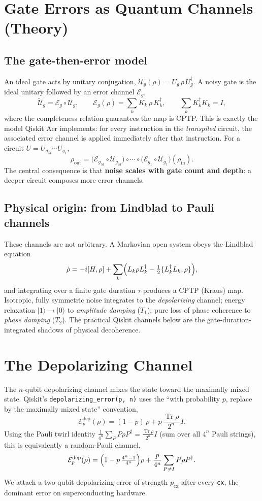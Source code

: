 \documentclass[11pt]{article}
\newcommand{\ket}[1]{|#1\rangle}
\newcommand{\Tr}{\operatorname{Tr}}
\begin{document}
\section{Gate Errors as Quantum Channels (Theory)}

\subsection{The gate-then-error model}

An ideal gate acts by unitary conjugation, $\mathcal{U}_g(\rho)=U_g\,\rho\,U_g^\dagger$. A noisy gate is the ideal unitary followed by an error channel $\mathcal{E}_g$,
\[
  \tilde{\mathcal{U}}_g=\mathcal{E}_g\circ\mathcal{U}_g ,
\qquad
  \mathcal{E}_g(\rho)=\sum_k K_k\,\rho\,K_k^\dagger ,
\qquad
  \sum_k K_k^\dagger K_k = I ,
\]
where the completeness relation guarantees the map is CPTP. This is exactly the model Qiskit Aer implements: for every instruction in the \emph{transpiled} circuit, the associated error channel is applied immediately after that instruction. For a circuit $U=U_{g_M}\cdots U_{g_1}$,
\[
  \rho_{\mathrm{out}}
  =\bigl(\mathcal{E}_{g_M}\circ\mathcal{U}_{g_M}\bigr)\circ\cdots\circ
   \bigl(\mathcal{E}_{g_1}\circ\mathcal{U}_{g_1}\bigr)(\rho_{\mathrm{in}}).
\]
The central consequence is that \textbf{noise scales with gate count and depth}: a deeper circuit composes more error channels.

\subsection{Physical origin: from Lindblad to Pauli channels}

These channels are not arbitrary. A Markovian open system obeys the Lindblad equation
\[
  \dot{\rho}=-i[H,\rho]+\sum_k\Bigl(L_k\rho L_k^\dagger-\tfrac12\{L_k^\dagger L_k,\rho\}\Bigr),
\]
and integrating over a finite gate duration $\tau$ produces a CPTP (Kraus) map. Isotropic, fully symmetric noise integrates to the \emph{depolarizing} channel; energy relaxation $\ket{1}\to\ket{0}$ to \emph{amplitude damping} ($T_1$); pure loss of phase coherence to \emph{phase damping} ($T_2$). The practical Qiskit channels below are the gate-duration-integrated shadows of physical decoherence.

\section{The Depolarizing Channel}

The $n$-qubit depolarizing channel mixes the state toward the maximally mixed state. Qiskit's \texttt{depolarizing\_error(p, n)} uses the ``with probability $p$, replace by the maximally mixed state'' convention,
\[
  \mathcal{E}^{\mathrm{dep}}_p(\rho)
  =(1-p)\,\rho+p\,\frac{\Tr\rho}{2^n}\,I .
\]
Using the Pauli twirl identity $\frac{1}{4^n}\sum_{P}P\rho P^\dagger=\frac{\Tr\rho}{2^n}I$ (sum over all $4^n$ Pauli strings), this is equivalently a random-Pauli channel,
\[
  \mathcal{E}^{\mathrm{dep}}_p(\rho)
  =\Bigl(1-p\,\tfrac{4^n-1}{4^n}\Bigr)\rho
   +\frac{p}{4^n}\sum_{P\neq I}P\rho P^\dagger .
\]
We attach a two-qubit depolarizing error of strength $p_{\mathrm{cx}}$ after every \texttt{cx}, the dominant error on superconducting hardware.
\end{document}
